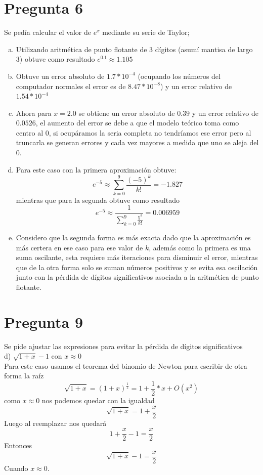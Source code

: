 \documentclass{article}
\begin{document}
\section*{Pregunta 6}
Se pedía calcular el valor de $e^{x}$ mediante su serie de Taylor;
\begin{enumerate}[a)]
\item Utilizando aritmética de punto flotante de 3 dígitos (asumí mantisa de largo 3) obtuve como resultado $e^{0.1}\approx 1.105$
\item Obtuve un error absoluto de $1.7*10^{-4}$ (ocupando los números del computador normales el error es de $8.47*10^{-8}$) y un error relativo de$1.54*10^{-4}$
\item Ahora para $x=2.0$ se obtiene un error absoluto de $0.39$ y un error relativo de $0.0526$, el aumento del error se debe a que el modelo teórico toma como centro al $0$, si ocupáramos la seria completa no tendríamos ese error pero al truncarla se generan errores y cada vez mayores a medida que uno se aleja del $0$.
\item Para este caso con la primera aproximación obtuve:
$$e^{-5}\approx \sum_{k=0}^{9}\frac{(-5)^{k}}{k!}= -1.827 $$
mientras que para la segunda obtuve como resultado
$$e^{-5}\approx \frac{1}{\sum_{k=0}^{9}\frac{5^{k}}{k!}}= 0.006959$$
\item Considero que la segunda forma es más exacta dado que la aproximación es más certera en ese caso para ese valor de $k$, además como la primera es una suma oscilante, esta requiere más iteraciones para disminuir el error, mientras que de la otra forma solo se suman números positivos y se evita esa oscilación junto con la pérdida de dígitos significativos asociada a la aritmética de punto flotante.
\end{enumerate}
\section*{Pregunta 9}
Se pide ajustar las expresiones para evitar la pérdida de dígitos significativos\\

d)  $\sqrt{1+x}-1$ con $x\approx 0$\\
Para este caso usamos el teorema del binomio de Newton para escribir de otra forma la raíz
$$\sqrt{1+x} = (1+x)^{\frac{1}{2}}= 1+\frac{1}{2}*x + O(x^{2})$$
como $x\approx 0$ nos podemos quedar con la igualdad 
$$\sqrt{1+x}=1+\frac{x}{2}$$
Luego al reemplazar nos quedará 
$$1+\frac{x}{2}-1=\frac{x}{2}$$
Entonces 
$$\sqrt{1+x}-1 = \frac{x}{2}$$ 
Cuando $x\approx 0$.\\
\end{document}
